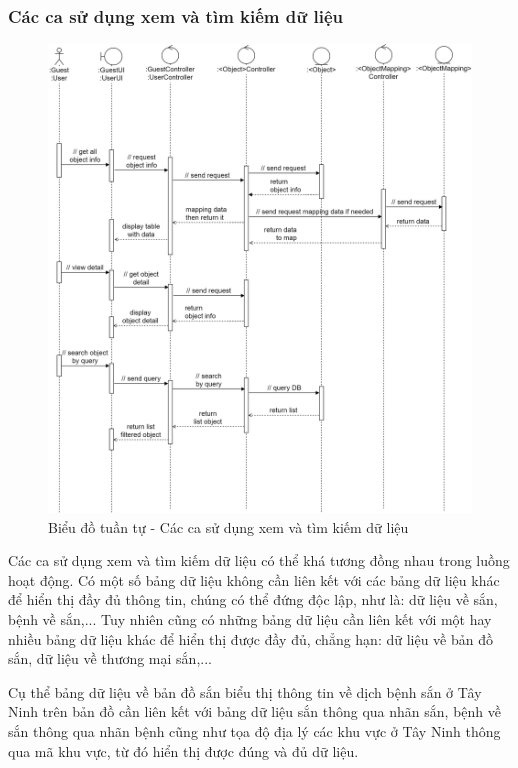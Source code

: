 \documentclass[./../main.tex]{subfiles}
\begin{document}
\subsubsection{Các ca sử dụng xem và tìm kiếm dữ liệu}
\begin{figure}[H]
	\centering
	\includegraphics[width=\linewidth]{./img/uc6-11.png}
	\caption{Biểu đồ tuần tự - Các ca sử dụng xem và tìm kiếm dữ liệu}
\end{figure}

Các ca sử dụng xem và tìm kiếm dữ liệu có thể khá tương đồng nhau trong luồng hoạt động. Có một số bảng dữ liệu không cần liên kết với các bảng dữ liệu khác để hiển thị đầy đủ thông tin, chúng có thể đứng độc lập, như là: dữ liệu về sắn, bệnh về sắn,... Tuy nhiên cũng có những bảng dữ liệu cần liên kết với một hay nhiều bảng dữ liệu khác để hiển thị được đầy đủ, chẳng hạn: dữ liệu về bản đồ sắn, dữ liệu về thương mại sắn,...

Cụ thể bảng dữ liệu về bản đồ sắn biểu thị thông tin về dịch bệnh sắn ở Tây Ninh trên bản đồ cần liên kết với bảng dữ liệu sắn thông qua nhãn sắn, bệnh về sắn thông qua nhãn bệnh cũng như tọa độ địa lý các khu vực ở Tây Ninh thông qua mã khu vực, từ đó hiển thị được đúng và đủ dữ liệu.
\end{document}
